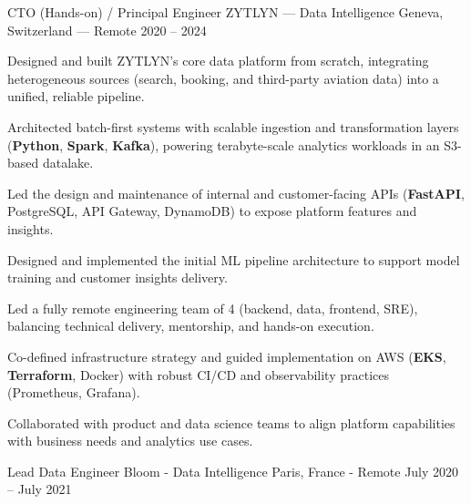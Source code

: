 

\begin{cventries}

\cventry
  {CTO (Hands-on) / Principal Engineer}
  {ZYTLYN — Data Intelligence}
  {Geneva, Switzerland — Remote}
  {2020 -- 2024}
  {
    \begin{cvitems}
      \item {Designed and built ZYTLYN’s core data platform from scratch, integrating heterogeneous sources (search, booking, and third-party aviation data) into a unified, reliable pipeline.}
      \item {Architected batch-first systems with scalable ingestion and transformation layers (\textbf{Python}, \textbf{Spark}, \textbf{Kafka}), powering terabyte-scale analytics workloads in an S3-based datalake.}
      \item {Led the design and maintenance of internal and customer-facing APIs (\textbf{FastAPI}, PostgreSQL, API Gateway, DynamoDB) to expose platform features and insights.}
      \item {Designed and implemented the initial ML pipeline architecture to support model training and customer insights delivery.}
      \item {Led a fully remote engineering team of 4 (backend, data, frontend, SRE), balancing technical delivery, mentorship, and hands-on execution.}
      \item {Co-defined infrastructure strategy and guided implementation on AWS (\textbf{EKS}, \textbf{Terraform}, Docker) with robust CI/CD and observability practices (Prometheus, Grafana).}
      \item {Collaborated with product and data science teams to align platform capabilities with business needs and analytics use cases.}
    \end{cvitems}
  }
\cventry
  {Lead Data Engineer} %
  {Bloom - Data Intelligence} %
  {Paris, France - Remote} %
  {July 2020 – July 2021} %
  {
    \begin{cvitems} %

\end{cvitems}}
\end{cventries}
